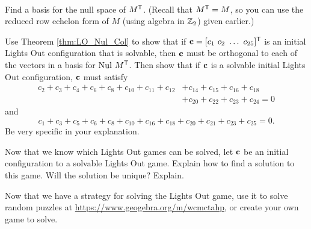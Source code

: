 \begin{pactivity} ~
\ba
\item Find a basis for the null space of $M^{\mathsf{T}}$. (Recall that $M^{\mathsf{T}} = M$, so you can use the reduced row echelon form of $M$ (using algebra in $\mathbb{Z}_2$) given earlier.) 



\item Use  Theorem \ref{thm:LO_Nul_Col}  to show that if $\mathbf{c} = [c_1 \  c_2 \  \ldots \  c_{25}]^{\mathsf{T}}$ is an initial Lights Out configuration that is solvable, then $\mathbf{c}$ must be orthogonal to each of the vectors in a basis for $\text{Nul } M^{\mathsf{T}}$. Then show that if $\mathbf{c}$ is a solvable initial Lights Out configuration, $\mathbf{c}$ must satisfy
\begin{align*}
c_2 + c_3 + c_4 + c_6 + c_8 + c_{10} + c_{11} + c_{12} &+ c_{14} + c_{15} + c_{16} + c_{18}  \\
	&+ c_{20} + c_{22} + c_{23} + c_{24} = 0 
\end{align*}
and
\begin{equation*}
c_1 + c_3 + c_5 + c_6 + c_8 + c_{10} + c_{16} + c_{18} + c_{20} + c_{21} + c_{23} + c_{25} = 0.
\end{equation*}
Be very specific in your explanation.


\ea
\end{pactivity}



\begin{pactivity} Now that we know which Lights Out games can be solved, let $\mathbf{c}$ be an initial configuration to a solvable Lights Out game. Explain how to find a solution to this game. Will the solution be unique? Explain.
\end{pactivity}


Now that we have a strategy for solving the Lights Out game, use it to solve random puzzles at \url{https://www.geogebra.org/m/wcmctahp}, or create your own game to solve. 





